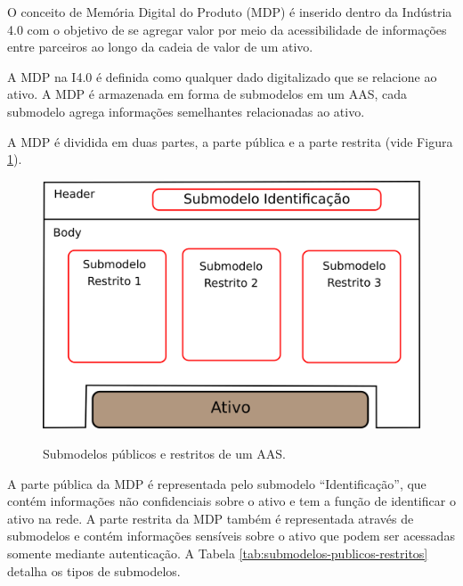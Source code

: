 \documentclass[
	12pt,				%
	oneside,			%
	a4paper,			%
	english,			%
	brazil				%
]{abntex2}
\begin{document}
	O conceito de Memória Digital do Produto (MDP) é inserido dentro da Indústria 4.0 com o objetivo de se agregar valor por meio da acessibilidade de informações entre parceiros ao longo da cadeia de valor de um ativo.
	
	A MDP na I4.0 é definida como qualquer dado digitalizado que se relacione ao ativo. A MDP é armazenada em forma de submodelos em um AAS, cada submodelo agrega informações semelhantes relacionadas ao ativo.
	
	A MDP é dividida em duas partes, a parte pública e a parte restrita (vide Figura \ref{fig:submodelos-publicos-e-restritos}).
	
	\begin{figure}[H]
		\centering
		\caption{Submodelos públicos e restritos de um AAS.}
		\includegraphics[width=1\textwidth]{submodelos-publicos-e-restritos.png}
		\label{fig:submodelos-publicos-e-restritos}
	\end{figure}

	A parte pública da MDP é representada pelo submodelo ``Identificação'', que contém informações não confidenciais sobre o ativo e tem a função de identificar o ativo na rede. A parte restrita da MDP também é representada através de submodelos e contém informações sensíveis sobre o ativo que podem ser acessadas somente mediante autenticação. A Tabela \ref{tab:submodelos-publicos-restritos} detalha os tipos de submodelos.
	
\end{document}
